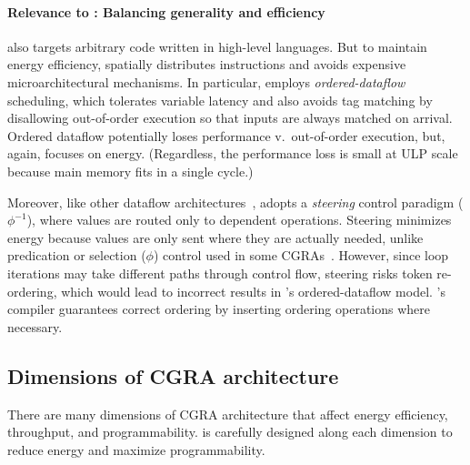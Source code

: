 \paragraph{Relevance to \riptide: Balancing generality and efficiency}
%
\riptide also targets arbitrary code written in high-level languages.
%
But to maintain energy efficiency, \riptide spatially distributes instructions
and avoids expensive microarchitectural mechanisms.
%
In particular, \riptide employs \emph{ordered-dataflow} scheduling,
which tolerates variable latency
and also avoids tag matching by disallowing
out-of-order execution so that inputs are always matched on arrival.
%
Ordered dataflow potentially loses performance v.\ out-of-order
execution, but, again, \riptide focuses on energy.
%
(Regardless, the performance loss is small at ULP scale because main memory
fits in a single cycle.)

Moreover, like other dataflow
architectures~\cite{swanson2003wavescalar,dataflow-a-complement,mishra2006tartan,beret,seed,dennis1975preliminary},
\riptide adopts a \emph{steering} control paradigm ($\phi^{-1}$), where
values are routed only to dependent operations.
%
Steering minimizes energy because values are only sent where they
are actually needed,
unlike predication or selection ($\phi$) control used
in some CGRAs~\cite{trips,snafu}.
%
However, since loop iterations may take different paths through
control flow, steering risks token re-ordering, which
would lead to incorrect results in \riptide's ordered-dataflow model.
%
\riptide's compiler guarantees correct ordering by inserting ordering
operations where necessary.


\subsection{Dimensions of CGRA architecture}
There are many dimensions of CGRA architecture that affect energy efficiency, throughput, and programmability.
% 
\riptide is carefully designed along each dimension to reduce energy and maximize programmability.


